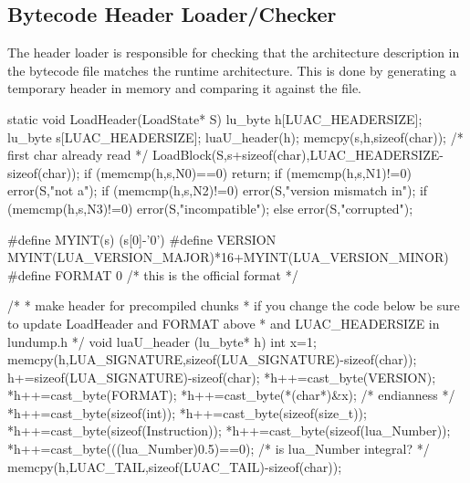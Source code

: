 
\subsection{Bytecode Header Loader/Checker}

	The header loader is responsible for checking that the architecture
	description in the bytecode file matches the runtime architecture.
	This is done by generating a temporary header in memory and comparing
	it against the file.


\begin{LuaCCode}[caption=Definition of \func{LoadHeader} from \filename{lundump.c}]
static void LoadHeader(LoadState* S)
{
 lu_byte h[LUAC_HEADERSIZE];
 lu_byte s[LUAC_HEADERSIZE];
 luaU_header(h);
 memcpy(s,h,sizeof(char));			/* first char already read */
 LoadBlock(S,s+sizeof(char),LUAC_HEADERSIZE-sizeof(char));
 if (memcmp(h,s,N0)==0) return;
 if (memcmp(h,s,N1)!=0) error(S,"not a");
 if (memcmp(h,s,N2)!=0) error(S,"version mismatch in");
 if (memcmp(h,s,N3)!=0) error(S,"incompatible"); else error(S,"corrupted");
}
\end{LuaCCode}


\begin{LuaCCode}[caption=Definition of \func{luaU\_header} from \filename{lundump.c}]
#define MYINT(s)	(s[0]-'0')
#define VERSION		MYINT(LUA_VERSION_MAJOR)*16+MYINT(LUA_VERSION_MINOR)
#define FORMAT		0		/* this is the official format */

/*
* make header for precompiled chunks
* if you change the code below be sure to update LoadHeader and FORMAT above
* and LUAC_HEADERSIZE in lundump.h
*/
void luaU_header (lu_byte* h)
{
 int x=1;
 memcpy(h,LUA_SIGNATURE,sizeof(LUA_SIGNATURE)-sizeof(char));
 h+=sizeof(LUA_SIGNATURE)-sizeof(char);
 *h++=cast_byte(VERSION);
 *h++=cast_byte(FORMAT);
 *h++=cast_byte(*(char*)&x);			/* endianness */
 *h++=cast_byte(sizeof(int));
 *h++=cast_byte(sizeof(size_t));
 *h++=cast_byte(sizeof(Instruction));
 *h++=cast_byte(sizeof(lua_Number));
 *h++=cast_byte(((lua_Number)0.5)==0);		/* is lua_Number integral? */
 memcpy(h,LUAC_TAIL,sizeof(LUAC_TAIL)-sizeof(char));
}
\end{LuaCCode}

